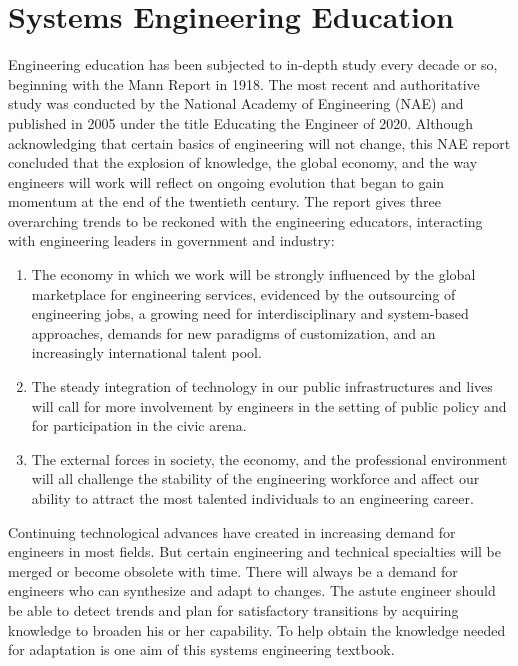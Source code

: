 \section{Systems Engineering Education}

Engineering education has been subjected to in-depth study every decade or so, beginning with the Mann Report in 1918. The most recent and authoritative study was conducted by the National Academy of Engineering (NAE) and published in 2005 under the title Educating the Engineer of 2020.
Although acknowledging that certain basics of engineering will not change, this NAE report concluded that the explosion of knowledge, the global economy, and the way engineers will work will reflect on ongoing evolution that began to gain momentum at the end of the twentieth century. The report gives three overarching trends to be reckoned with the engineering educators, interacting with engineering leaders in government and industry:

\begin{enumerate}
\item The economy in which we work will be strongly influenced by the global marketplace for engineering services, evidenced by the outsourcing of engineering jobs, a growing need for interdisciplinary and system-based approaches, demands for new paradigms of customization, and an increasingly international talent pool.
\item The steady integration of technology in our public infrastructures and lives will call for more involvement by engineers in the setting of public policy and for participation in the civic arena.
\item The external forces in society, the economy, and the professional environment will all challenge the stability of the engineering workforce and affect our ability to attract the most talented individuals to an engineering career.
\end{enumerate}

Continuing technological advances have created in increasing demand for engineers in most fields. But certain engineering and technical specialties will be merged or become obsolete with time. There will always be a demand for engineers who can synthesize and adapt to changes. The astute engineer should be able to detect trends and plan for satisfactory transitions by acquiring knowledge to broaden his or her capability. To help obtain the knowledge needed for adaptation is one aim of this systems engineering textbook.

